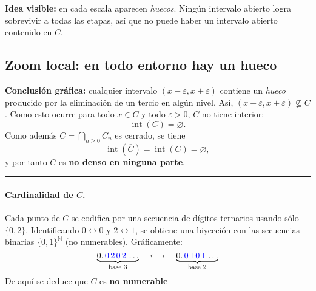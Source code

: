 \documentclass[12pt]{article}
\newcommand{\seg}[2]{\draw[line width=1.2pt] (#1,0)--(#2,0);}
\begin{document}
\noindent
\textbf{Idea visible:} en cada escala aparecen \emph{huecos}. Ningún intervalo abierto logra
sobrevivir a todas las etapas, así que no puede haber un intervalo abierto
contenido en $C$.

\subsection*{Zoom local: en todo entorno hay un hueco}
\begin{center}
\end{center}

\noindent
\textbf{Conclusión gráfica:} cualquier intervalo $(x-\varepsilon,x+\varepsilon)$ contiene un
\emph{hueco} producido por la eliminación de un tercio en algún nivel.
Así, $(x-\varepsilon,x+\varepsilon)\nsubseteq C$. Como esto ocurre para todo $x\in C$
y todo $\varepsilon>0$, $C$ no tiene interior:
\[
\operatorname{int}(C)=\varnothing.
\]
Como además $C=\bigcap_{n\ge0}C_n$ es cerrado, se tiene
\[
\operatorname{int}(\overline{C})=\operatorname{int}(C)=\varnothing,
\]
y por tanto $C$ es \textbf{no denso en ninguna parte}.

\bigskip
\hrule
\bigskip

\paragraph{Cardinalidad de $C$.}
Cada punto de $C$ se codifica por una secuencia de dígitos ternarios usando sólo $\{0,2\}$.
Identificando $0\leftrightarrow 0$ y $2\leftrightarrow 1$, se obtiene una biyección con
las secuencias binarias $\{0,1\}^{\mathbb{N}}$ (no numerables). Gráficamente:
\[
\underbrace{0.\,{\color{blue}0}\,{\color{blue}2}\,{\color{blue}0}\,{\color{blue}2}\,\dots}_{\text{base }3}
\quad\longleftrightarrow\quad
\underbrace{0.\,{\color{blue}0}\,{\color{blue}1}\,{\color{blue}0}\,{\color{blue}1}\,\dots}_{\text{base }2}
\]
De aquí se deduce que $C$ es \textbf{no numerable}
\end{document}
